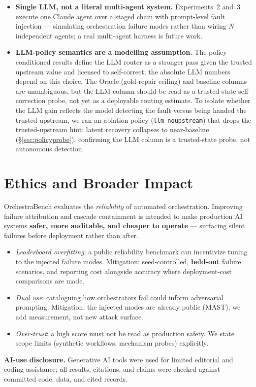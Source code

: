 \documentclass[sigconf,nonacm,anonymous]{acmart}  %
\begin{document}
\begin{itemize}
  across framings while absolute rates shift with context. Full finance, HR,
  and DevOps suite validation remains future work.
  \item \textbf{Single LLM, not a literal multi-agent system.} Experiments~2 and~3 execute one
  Claude agent over a staged chain with prompt-level fault injection ---
  simulating orchestration failure modes rather than wiring $N$ independent
  agents; a real multi-agent harness is future work.
  \item \textbf{LLM-policy semantics are a modelling assumption.} The
  policy-conditioned results define the LLM router as a stronger pass given the
  trusted upstream value and licensed to self-correct; the absolute LLM numbers
  depend on this choice. The Oracle (gold-repair ceiling) and baseline columns
  are unambiguous, but the LLM column should be read as a trusted-state
  self-correction probe, not yet as a deployable routing estimate. To isolate whether
  the LLM gain reflects the model detecting the fault versus being handed the trusted
  upstream, we ran an ablation policy (\texttt{llm\_noupstream}) that drops the
  trusted-upstream hint: latent recovery collapses to near-baseline (\S\ref{sec:policyprobe}), confirming
  the LLM column is a trusted-state probe, not autonomous detection.
\end{itemize}

\section{Ethics and Broader Impact}
OrchestraBench evaluates the \emph{reliability} of automated orchestration.
Improving failure attribution and cascade containment is intended to make
production AI systems \textbf{safer, more auditable, and cheaper to operate} ---
surfacing silent failures before deployment rather than after.
\begin{itemize}
  \item \emph{Leaderboard overfitting}: a public reliability benchmark can
  incentivize tuning to the injected failure modes. Mitigation: seed-controlled,
  \textbf{held-out} failure scenarios, and reporting cost alongside accuracy
  where deployment-cost comparisons are made.
  \item \emph{Dual use}: cataloguing how orchestrators fail could inform
  adversarial prompting. Mitigation: the injected modes are already public (MAST);
  we add measurement, not new attack surface.
  \item \emph{Over-trust}: a high score must not be read as production safety. We
  state scope limits (synthetic workflows; mechanism probes) explicitly.
\end{itemize}
\textbf{AI-use disclosure.} Generative AI tools were used for limited editorial
and coding assistance; all results, citations, and claims were checked against
committed code, data, and cited records.
\end{document}
